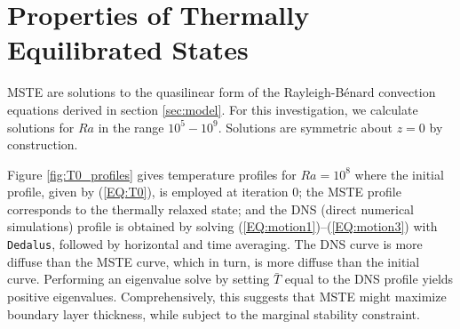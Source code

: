 \documentclass[reprint,amsmath,amssymb,aps]{revtex4-1}
\begin{document}
\section{Properties of Thermally Equilibrated States}\label{sec:properties}
MSTE are solutions to the quasilinear form of the Rayleigh-B\'enard convection equations derived in section \ref{sec:model}. 
For this investigation, we calculate solutions for $Ra$ in the range $10^5 - 10^9$. 
Solutions are symmetric about $z = 0$ by construction. 

Figure \ref{fig:T0_profiles} gives temperature profiles for $Ra = 10^8$ where the initial profile, given by (\ref{EQ:T0}), is employed at iteration 0; the MSTE profile corresponds to the thermally relaxed state; and the DNS (direct numerical simulations) profile is obtained by solving (\ref{EQ:motion1})--(\ref{EQ:motion3}) with \texttt{Dedalus}, followed by horizontal and time averaging. 
The DNS curve is more diffuse than the MSTE curve, which in turn, is more diffuse than the initial curve. 
Performing an eigenvalue solve by setting $\bar{T}$ equal to the DNS profile yields positive eigenvalues. 
Comprehensively, this suggests that MSTE might maximize boundary layer thickness, while subject to the marginal stability constraint.
\end{document}
